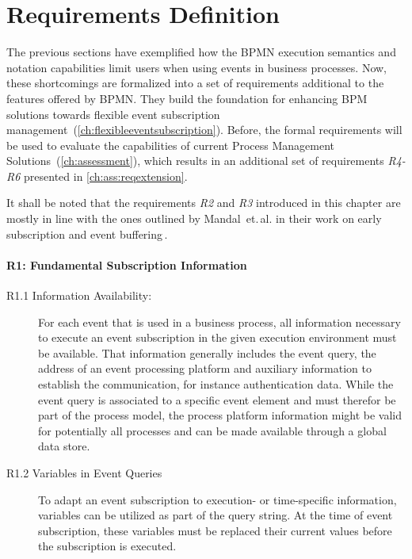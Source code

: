 \section{Requirements Definition}
The previous sections have exemplified how the BPMN execution semantics and notation capabilities limit users when using events in business processes. 
Now, these shortcomings are formalized into a set of requirements additional to the features offered by BPMN.
They build the foundation for enhancing BPM solutions towards flexible event subscription management~(\autoref{ch:flexibleeventsubscription}).
Before, the formal requirements will be used to evaluate the capabilities of current Process Management Solutions~(\autoref{ch:assessment}), which results in an additional set of requirements \textit{R4-R6} presented in \autoref{ch:ass:reqextension}.

\medskip \noindent
It shall be noted that the requirements \textit{R2} and \textit{R3} introduced in this chapter are mostly in line with the ones outlined by Mandal~et.\,al. in their work on early subscription and event buffering\,\cite{mandal:2017}.



\paragraph{R1: Fundamental Subscription Information}

\begin{description}
	\item[R1.1 Information Availability:]
	For each event that is used in a business process, all information necessary to execute an event subscription in the given execution environment must be available.
	That information generally includes the event query, the address of an event processing platform and auxiliary information to establish the communication, for instance authentication data.
	While the event query is associated to a specific event element and must therefor be part of the process model, the process platform information might be valid for potentially all processes and can be made available through a global data store.
	\item[R1.2 Variables in Event Queries] 
	To adapt an event subscription to execution- or time-specific information, variables can be utilized as part of the query string.
	At the time of event subscription, these variables must be replaced their current values before the subscription is executed.
\end{description}

